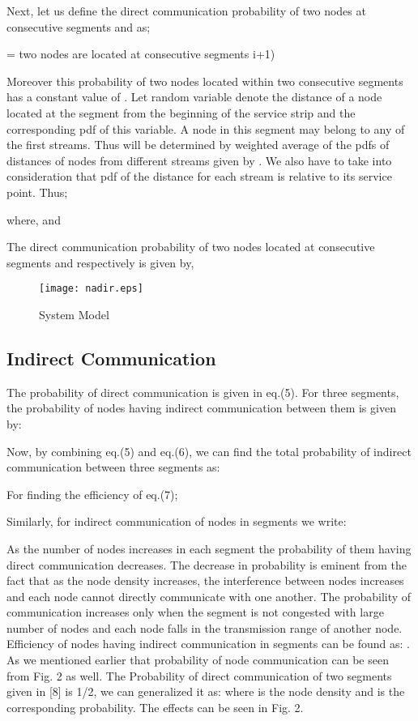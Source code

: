 \documentclass[journal]{IEEEtran}
\begin{document}
Next, let us define the direct communication probability of two nodes at consecutive segments  and  as;

\small
= two nodes are located at consecutive segments i+1)
\normalsize

Moreover this probability of two nodes located within two consecutive segments has a constant value of .
Let random variable   denote the distance of a node located at the segment  from the beginning of the service strip and   the corresponding pdf of this variable. A node in this segment may belong to any of the first  streams. Thus  will be determined by weighted average of the pdfs of distances of nodes from different streams given by . We also have to take into consideration that pdf of the distance for each stream is relative to its service point. Thus;

\hspace{-0.5cm}
\tiny

\normalsize
where,  and 

The direct communication probability of two nodes located at consecutive segments  and  respectively is given by,
\tiny

\normalsize


\begin{figure*}[t]
\centering
  {\texttt{[image: nadir.eps]}}
  \caption{System Model}
\end{figure*}

\subsection{Indirect Communication}
The probability of direct communication is given in eq.(5). For three segments, the probability of nodes having indirect communication between them is given by:
\tiny

\normalsize
Now, by combining eq.(5) and eq.(6), we can find the total probability of indirect communication between three segments as:


For finding the efficiency of eq.(7);



Similarly, for indirect communication of nodes in  segments we write:







As the number of nodes increases in each segment the probability of them having direct communication decreases. The decrease in probability is eminent from the fact that as the node density increases, the interference between nodes increases and each node cannot directly communicate with one another.
The probability of communication increases only when the segment is not congested with large number of nodes and each node falls in the transmission range of another node.
Efficiency of nodes having indirect communication in  segments can be found as: . As we mentioned earlier that probability of node communication can be seen from Fig. 2 as well. The Probability of direct communication of two segments given in [8] is 1/2, we can generalized it as:  where  is the node density and  is the corresponding probability.
The effects can be seen in Fig. 2.
\end{document}
